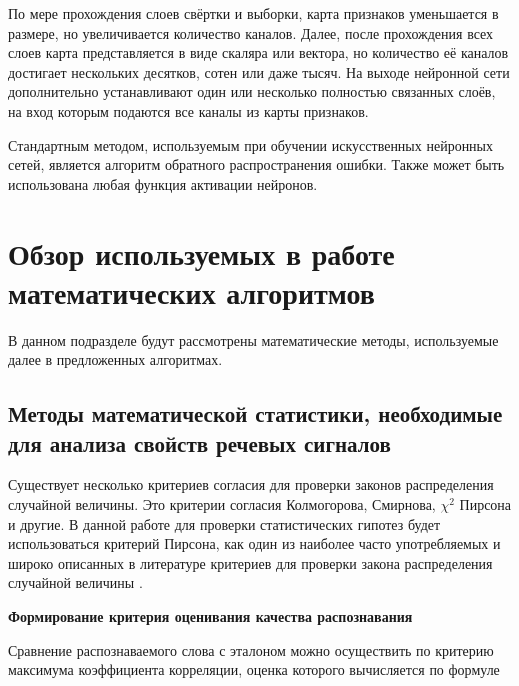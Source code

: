По мере прохождения слоев свёртки и выборки, карта признаков уменьшается в размере, но увеличивается количество каналов.
Далее, после прохождения всех слоев карта представляется в виде скаляра или вектора, но количество её каналов достигает нескольких десятков, сотен или даже тысяч.
На выходе нейронной сети дополнительно устанавливают один или несколько полностью связанных слоёв, на вход которым подаются все каналы из карты признаков.

Стандартным методом, используемым при обучении искусственных нейронных сетей, является алгоритм обратного распространения ошибки.
Также может быть использована любая функция активации нейронов.


\section{Обзор используемых в работе математических алгоритмов} \label{sect1_4}

В данном подразделе будут рассмотрены математические методы, используемые далее в предложенных алгоритмах.


\subsection{Методы математической статистики, необходимые для анализа свойств речевых сигналов} \label{sect1_4_1}

Существует несколько критериев согласия для проверки законов распределения случайной величины.
Это критерии согласия Колмогорова, Смирнова, $\chi^2$ Пирсона и другие.
В данной работе для проверки статистических гипотез будет использоваться критерий Пирсона, как один из наиболее часто употребляемых и широко описанных в литературе критериев для проверки закона распределения случайной величины \cite{panteleev2001}.

\textbf{Формирование критерия оценивания качества распознавания}

Сравнение распознаваемого слова с эталоном можно осуществить по критерию максимума коэффициента корреляции, оценка которого вычисляется по формуле 

